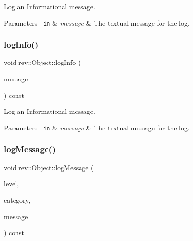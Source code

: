 Log an Informational message. 


\begin{DoxyParams}[1]{Parameters}
\mbox{\texttt{ in}}  & {\em message} & The textual message for the log. \\
\hline
\end{DoxyParams}
\mbox{\label{classrev_1_1_object_ae75e2d9d3dc2c7ff4407d5be4075b348}} 
\subsubsection{\texorpdfstring{logInfo()}{logInfo()}\hspace{0.1cm}{\footnotesize\ttfamily [2/2]}}
{\footnotesize\ttfamily void rev\+::\+Object\+::log\+Info (\begin{DoxyParamCaption}\item[{const std\+::string \&}]{message }\end{DoxyParamCaption}) const\hspace{0.3cm}{\ttfamily [inline]}}



Log an Informational message. 


\begin{DoxyParams}[1]{Parameters}
\mbox{\texttt{ in}}  & {\em message} & The textual message for the log. \\
\hline
\end{DoxyParams}
\mbox{\label{classrev_1_1_object_a763fca366d830bfdab969e164420d7ed}} 
\subsubsection{\texorpdfstring{logMessage()}{logMessage()}\hspace{0.1cm}{\footnotesize\ttfamily [1/2]}}
{\footnotesize\ttfamily void rev\+::\+Object\+::log\+Message (\begin{DoxyParamCaption}\item[{Log\+Level}]{level,  }\item[{const char $\ast$}]{category,  }\item[{const char $\ast$}]{message }\end{DoxyParamCaption}) const}



